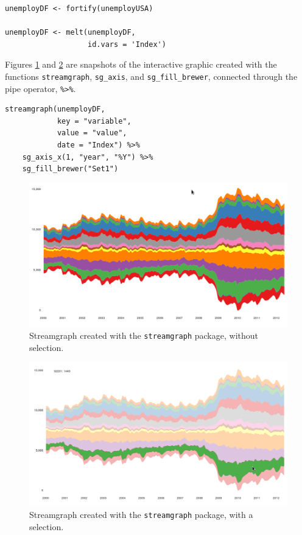 \lstset{language=r,label= ,caption= ,captionpos=b,numbers=none}
\begin{lstlisting}
unemployDF <- fortify(unemployUSA)

unemployDF <- melt(unemployDF,
                   id.vars = 'Index')
\end{lstlisting}

Figures \ref{fig:streamgraph_interactive} and
\ref{fig:streamgraph_interactive_selected} are snapshots of the
interactive graphic created with the functions \texttt{streamgraph},
\texttt{sg\_axis}, and \texttt{sg\_fill\_brewer}, connected through the pipe operator,
\texttt{\%>\%}.

\lstset{language=r,label= ,caption= ,captionpos=b,numbers=none}
\begin{lstlisting}
streamgraph(unemployDF,
            key = "variable",
            value = "value",
            date = "Index") %>%
    sg_axis_x(1, "year", "%Y") %>%
    sg_fill_brewer("Set1")
\end{lstlisting}

\begin{figure}[htbp]
\centering
\includegraphics[width=.9\linewidth]{figs/streamgraph_interactive.png}
\caption{Streamgraph created with the \texttt{streamgraph} package, without selection. \label{fig:streamgraph_interactive}}
\end{figure}

\begin{figure}[htbp]
\centering
\includegraphics[width=.9\linewidth]{figs/streamgraph_interactive_selected.png}
\caption{Streamgraph created with the \texttt{streamgraph} package, with a selection. \label{fig:streamgraph_interactive_selected}}
\end{figure}
